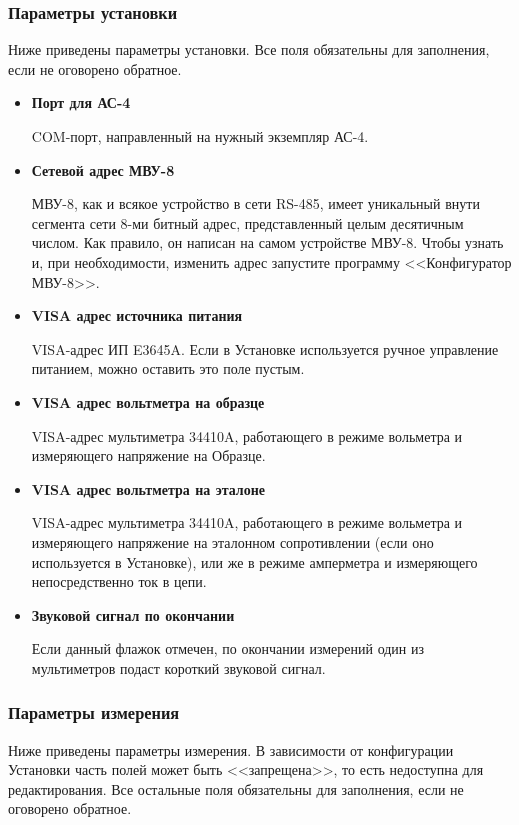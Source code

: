 \documentclass[12pt, a4paper, twocolumn]{book}
\newcommand{\PARAM}[1]{\item {\bf #1} }
\begin{document}
\subsubsection{Параметры установки}

Ниже приведены параметры установки. Все поля обязательны для заполнения, если не оговорено обратное.

\begin{itemize}

\PARAM{Порт для АС-4}

COM-порт, направленный на нужный экземпляр АС-4. 

\PARAM{Сетевой адрес МВУ-8}

МВУ-8, как и всякое устройство в сети RS-485, имеет уникальный внути сегмента сети 8-ми битный адрес, представленный целым десятичным числом. Как правило, он написан на самом устройстве МВУ-8. Чтобы узнать и, при необходимости, изменить адрес запустите программу <<Конфигуратор МВУ-8>>.

\PARAM{VISA адрес источника питания}

VISA-адрес ИП E3645A. Если в Установке используется ручное управление питанием, можно оставить это поле пустым.

\PARAM{VISA адрес вольтметра на образце}

VISA-адрес мультиметра 34410A, работающего в режиме вольметра и измеряющего напряжение на Образце.

\PARAM{VISA адрес вольтметра на эталоне}

VISA-адрес мультиметра 34410A, работающего в режиме вольметра и измеряющего напряжение на эталонном сопротивлении (если оно используется в Установке), или же в режиме амперметра и измеряющего непосредственно ток в цепи.

\PARAM{Звуковой сигнал по окончании}

Если данный флажок отмечен, по окончании измерений один из мультиметров подаст короткий звуковой сигнал.

\end{itemize}

\subsubsection{Параметры измерения}

Ниже приведены параметры измерения. В зависимости от конфигурации Установки часть полей может быть <<запрещена>>, то есть недоступна для редактирования. Все остальные поля обязательны для заполнения, если не оговорено обратное.
\end{document}
